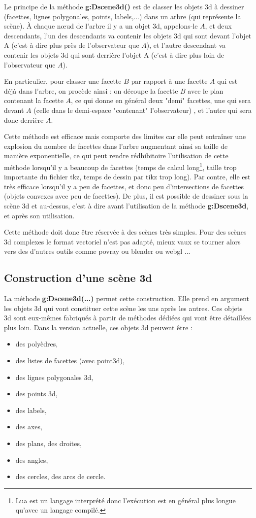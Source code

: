 \documentclass[%
10pt,%
a4paper,%
french,%
]%
{article}%
\begin{document}
Le principe de la méthode \textbf{g:Dscene3d()} est de classer les objets 3d à dessiner (facettes, lignes polygonales, points, labels,...) dans un arbre (qui représente la scène). À chaque n{\oe}ud de l'arbre il y a un objet 3d, appelons-le $A$, et deux descendants, l'un des descendants va contenir les objets 3d qui sont devant l'objet A (c'est à dire plus près de l'observateur que $A$), et l'autre descendant va contenir les objets 3d qui sont derrière l'objet A (c'est à dire plus loin de l'observateur que $A$).

En particulier, pour classer une facette $B$ par rapport à une facette $A$ qui est déjà dans l'arbre, on procède ainsi : on découpe la facette $B$ avec le plan contenant la facette $A$, ce qui donne en général deux "demi" facettes, une qui sera devant $A$ (celle dans le demi-espace "contenant" l'observateur) , et l'autre qui sera donc derrière $A$.

Cette méthode est efficace mais comporte des limites car elle peut entraîner une explosion du nombre de facettes dans l'arbre augmentant ainsi sa taille de manière exponentielle, ce qui peut rendre rédhibitoire l'utilisation de cette méthode lorsqu'il y a beaucoup de facettes (temps de calcul long\footnote{Lua est un langage interprété donc l'exécution est en général plus longue qu'avec un langage compilé.}, taille trop importante du fichier tkz, temps de dessin par tikz trop long). Par contre, elle est très efficace lorsqu'il y a peu de facettes, et donc peu d'intersections de facettes (objets convexes avec peu de facettes). De plus, il est possible de dessiner sous la scène 3d et au-dessus, c'est à dire avant l'utilisation de la méthode \textbf{g:Dscene3d}, et après son utilisation.

Cette méthode doit donc être réservée à des scènes très simples. Pour des scènes 3d complexes le format vectoriel n'est pas adapté, mieux vaux se tourner alors vers des d'autres outils comme povray ou blender ou webgl ...

\subsection{Construction d'une scène 3d}

La méthode \textbf{g:Dscene3d(...)} permet cette construction. Elle prend en argument les objets 3d qui vont constituer cette scène les uns après les autres. Ces objets 3d sont eux-mêmes fabriqués à partir de méthodes dédiées qui vont être détaillées plus loin. Dans la version actuelle, ces objets 3d peuvent être :
\begin{itemize}
    \item des polyèdres, 
    \item des listes de facettes (avec point3d),
    \item des lignes polygonales 3d,
    \item des points 3d,
    \item des labels,
    \item des axes,
    \item des plans, des droites,
    \item des angles,
    \item des cercles, des arcs de cercle.
\end{itemize}
\end{document}
